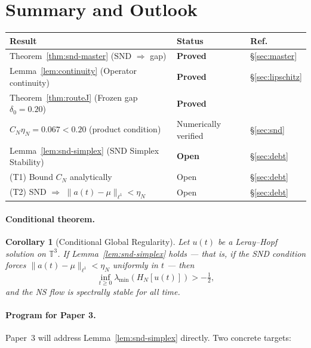 \documentclass[12pt]{amsart}
\newtheorem{corollary}[theorem]{Corollary}
\theoremstyle{definition}
\newcommand{\lmin}{\lambda_{\min}}
\begin{document}
\section{Summary and Outlook}
\label{sec:summary}

\begin{tcolorbox}[statusbox,
  title=\textbf{Paper 2 — Complete Status Table}]
\renewcommand{\arraystretch}{1.3}
\begin{tabular}{lll}
\toprule
\textbf{Result} & \textbf{Status} & \textbf{Ref.} \\
\midrule
Theorem~\ref{thm:snd-master} (SND $\Rightarrow$ gap)
  & \textbf{Proved} & \S\ref{sec:master} \\
Lemma~\ref{lem:continuity} (Operator continuity)
  & \textbf{Proved} & \S\ref{sec:lipschitz} \\
Theorem~\ref{thm:routeJ} (Frozen gap $\delta_0=0.20$)
  & \textbf{Proved} & \cite{Simons2026a} \\
$C_N\eta_N=0.067<0.20$ (product condition)
  & Numerically verified & \S\ref{sec:snd} \\
\midrule
Lemma~\ref{lem:snd-simplex} (SND Simplex Stability)
  & \textbf{Open} & \S\ref{sec:debt} \\
\quad (T1) Bound $C_N$ analytically
  & Open & \S\ref{sec:debt} \\
\quad (T2) SND $\Rightarrow$ $\|a(t)-\mu\|_{\ell^1}<\eta_N$
  & Open & \S\ref{sec:debt} \\
\bottomrule
\end{tabular}
\end{tcolorbox}

\paragraph{Conditional theorem.}
\begin{corollary}[Conditional Global Regularity]
\label{cor:main}
Let $u(t)$ be a Leray--Hopf solution on $\mathbb T^3$.
If Lemma~\ref{lem:snd-simplex} holds — that is, if the SND condition
forces $\|a(t)-\mu\|_{\ell^1}<\eta_N$ uniformly in $t$ — then
\[
\inf_{t\ge0}\lmin(H_N[u(t)]) > -\tfrac{1}{2},
\]
and the NS flow is spectrally stable for all time.
\end{corollary}

\paragraph{Program for Paper 3.}
Paper~3 will address Lemma~\ref{lem:snd-simplex} directly.
Two concrete targets:
\end{document}
